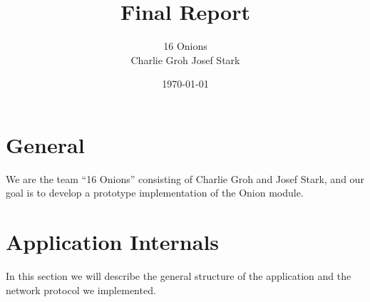 \documentclass{article}
\begin{document}
\title{\Huge Final Report \normalsize}
\date{\today}
\author{\LARGE 16 Onions \normalsize \\[5pt] Charlie Groh \hspace{20pt} Josef Stark}
\maketitle
{\let\thefootnote\relax{}}

\section{General}
We are the team ``16 Onions'' consisting of Charlie Groh and Josef Stark,
and our goal is to develop a prototype implementation of the Onion module.

\section{Application Internals}
In this section we will describe the general structure of the application and the network protocol we implemented.
\end{document}
